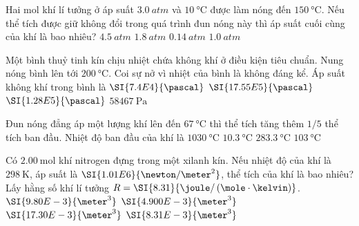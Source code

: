 \begin{ex}
	Hai mol khí lí tưởng ở áp suất $\SI{3.0}{atm}$ và $\SI{10}{\celsius}$ được làm nóng đến $\SI{150}{\celsius}$. Nếu thể tích được giữ không đổi trong quá trình đun nóng này thì áp suất cuối cùng của khí là bao nhiêu?
		\choice
	{\True $\SI{4.5}{atm}$}
	{$\SI{1.8}{atm}$}
	{$\SI{0.14}{atm}$}
	{$\SI{1.0}{atm}$}
\end{ex}
\begin{ex}
	Một bình thuỷ tinh kín chịu nhiệt chứa không khí ở điều kiện tiêu chuẩn. Nung nóng bình lên tới $\SI{200}{\celsius}$. Coi sự nở vì nhiệt của bình là không đáng kể. Áp suất không khí trong bình là
	\choice
	{$\SI{7.4E4}{\pascal}$}
	{\True $\SI{17.55E5}{\pascal}$}
	{$\SI{1.28E5}{\pascal}$}
	{$\SI{58467}{\pascal}$}
\end{ex}
\begin{ex}
	Đun nóng đẳng áp một lượng khí lên đến $\SI{67}{\celsius}$ thì thể tích tăng thêm $1/5$ thể tích ban đầu. Nhiệt độ ban đầu của khí là 
	\choice
	{$\SI{1030}{\celsius}$}
	{$\SI{10.3}{\celsius}$}
	{$\SI{283.3}{\celsius}$}
	{$\SI{103}{\celsius}$}
\end{ex}
\begin{ex}
	Có $\SI{2.00}{\mole}$ khí nitrogen đựng trong một xilanh kín. Nếu nhiệt độ của khí là $\SI{298}{\kelvin}$, áp suất là $\SI{1.01E6}{\newton/\meter^2}$, thể tích của khí là bao nhiêu? Lấy hằng số khí lí tưởng $R=\SI{8.31}{\joule/\left(\mole\cdot\kelvin\right)}$.
	\choice
	{$\SI{9.80E-3}{\meter^3}$}
	{\True $\SI{4.900E-3}{\meter^3}$}
	{$\SI{17.30E-3}{\meter^3}$}
	{$\SI{8.31E-3}{\meter^3}$}
\end{ex}
